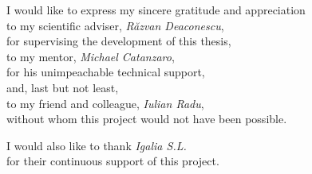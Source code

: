 \vspace*{7cm}
\begin{center}
I would like to express my sincere gratitude and appreciation\\
to my scientific adviser, \textit{Răzvan Deaconescu},\\
for supervising the development of this thesis,\\
to my mentor, \textit{Michael Catanzaro},\\
for his unimpeachable technical support,\\
and, last but not least,\\
to my friend and colleague, \textit{Iulian Radu},\\
without whom this project would not have been possible.
\end{center}
\vspace{0.5cm}
\begin{center}
I would also like to thank \textit{Igalia S.L.}\\
for their continuous support of this project.
\end{center}
